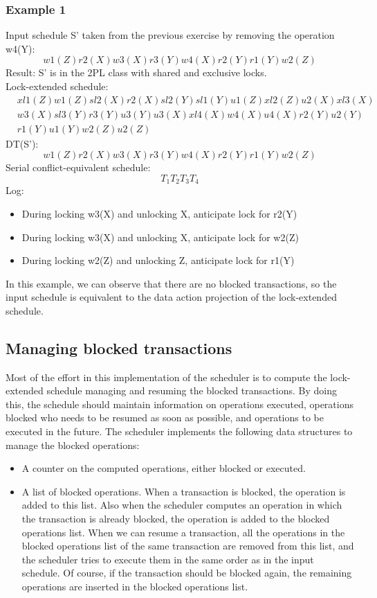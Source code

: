 \documentclass{article}
\begin{document}
\subsubsection{Example 1}
Input schedule S' taken from the previous exercise by removing the operation w4(Y):
$$w1(Z) r2(X) w3(X) r3(Y) w4(X) r2(Y) r1(Y) w2(Z)$$
Result: S' is in the 2PL class with shared and exclusive locks.
\\
Lock-extended schedule:
\begin{align*}
    &xl1(Z) w1(Z) sl2(X) r2(X) sl2(Y) sl1(Y) u1(Z) xl2(Z) u2(X) xl3(X)\\
    &w3(X) sl3(Y) r3(Y) u3(Y) u3(X) xl4(X) w4(X) u4(X) r2(Y) u2(Y)\\
    &r1(Y) u1(Y) w2(Z) u2(Z)
\end{align*}
DT(S'):
$$w1(Z) r2(X) w3(X) r3(Y) w4(X) r2(Y) r1(Y) w2(Z)$$
Serial conflict-equivalent schedule:
$$T_1 T_2 T_3 T_4$$
Log:
\begin{itemize}
    \item During locking w3(X) and unlocking X, anticipate lock for r2(Y)
    \item During locking w3(X) and unlocking X, anticipate lock for w2(Z)
    \item During locking w2(Z) and unlocking Z, anticipate lock for r1(Y)
\end{itemize}
In this example, we can observe that there are no blocked transactions, so the input schedule is equivalent to the data action projection of the lock-extended schedule.
\subsection{Managing blocked transactions}
Most of the effort in this implementation of the scheduler is to compute the lock-extended schedule managing and resuming the blocked transactions. By doing this, the schedule should maintain information on operations executed, operations blocked who needs to be resumed as soon as possible, and operations to be executed in the future. The scheduler implements the following data structures to manage the blocked operations:
\begin{itemize}
    \item A counter on the computed operations, either blocked or executed.
    \item A list of blocked operations. When a transaction is blocked, the operation is added to this list. Also when the scheduler computes an operation in which the transaction is already blocked, the operation is added to the blocked operations list. When we can resume a transaction, all the operations in the blocked operations list of the same transaction are removed from this list, and the scheduler tries to execute them in the same order as in the input schedule. Of course, if the transaction should be blocked again, the remaining operations are inserted in the blocked operations list.
\end{itemize}  
\end{document}

